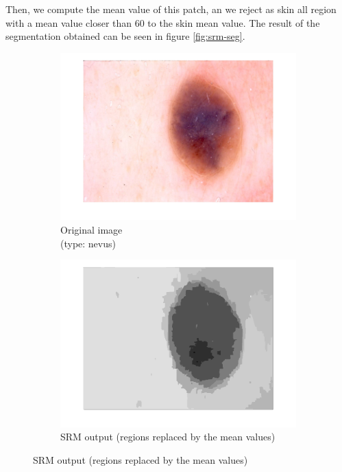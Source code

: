 \documentclass[a4paper,10pt]{article}
\begin{document}
Then, we compute the mean value of this patch, an we reject as skin all region with a mean value closer than 60 to the skin mean value. The result of the segmentation obtained can be seen in figure \ref{fig:srm-seg}.



\begin{figure}[h]
	\begin{subfigure}{0.329\linewidth}			
		\includegraphics[width=0.99\linewidth]{../results/srm/im-181}	
		\caption{Original image\\ (type: nevus)}
		\label{fig:srm-steps-orig}
	\end{subfigure}
	\begin{subfigure}{0.329\linewidth}			
		\includegraphics[width=0.99\linewidth]{../results/srm/srm-181}	  
		\caption{SRM output (regions replaced by the mean values)}

\end{subfigure}
\end{figure}
\end{document}
